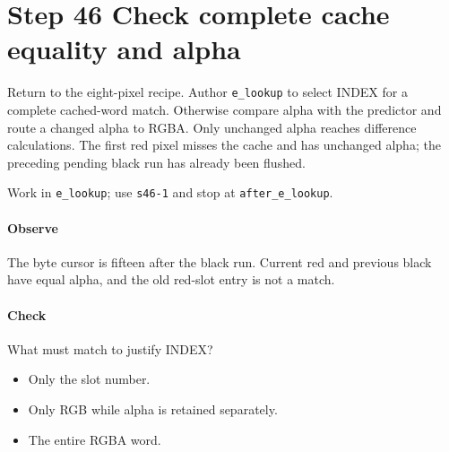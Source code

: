 \section{Step 46 Check complete cache equality and alpha}\label{qoi-s46}
Return to the eight-pixel recipe. Author \texttt{e\_lookup} to select INDEX for a complete cached-word match. Otherwise compare alpha with the predictor and route a changed alpha to RGBA. Only unchanged alpha reaches difference calculations. The first red pixel misses the cache and has unchanged alpha; the preceding pending black run has already been flushed.

Work in \texttt{e\_lookup}; use \texttt{s46-1} and stop at \texttt{after\_e\_lookup}.

\paragraph{Observe} The byte cursor is fifteen after the black run. Current red and previous black have equal alpha, and the old red-slot entry is not a match.

\paragraph{Check} What must match to justify INDEX?
\begin{itemize}
  \item[A.] Only the slot number.
  \item[B.] Only RGB while alpha is retained separately.
  \item[C.] The entire RGBA word.
\end{itemize}
